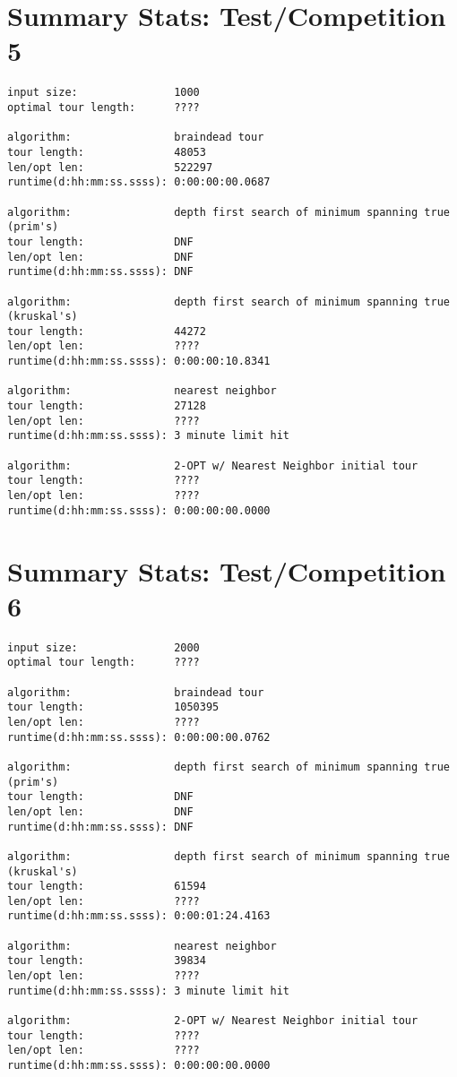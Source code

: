 \documentclass[12pt]{article}
\begin{document}
\newpage
\section*{Summary Stats: Test/Competition 5}
\begin{verbatim}
input size:               1000
optimal tour length:      ????

algorithm:                braindead tour
tour length:              48053
len/opt len:              522297
runtime(d:hh:mm:ss.ssss): 0:00:00:00.0687

algorithm:                depth first search of minimum spanning true (prim's) 
tour length:              DNF
len/opt len:              DNF
runtime(d:hh:mm:ss.ssss): DNF 

algorithm:                depth first search of minimum spanning true (kruskal's) 
tour length:              44272
len/opt len:              ????
runtime(d:hh:mm:ss.ssss): 0:00:00:10.8341

algorithm:                nearest neighbor 
tour length:              27128
len/opt len:              ????
runtime(d:hh:mm:ss.ssss): 3 minute limit hit

algorithm:                2-OPT w/ Nearest Neighbor initial tour
tour length:              ????
len/opt len:              ????
runtime(d:hh:mm:ss.ssss): 0:00:00:00.0000
\end{verbatim}

\newpage
\section*{Summary Stats: Test/Competition 6}
\begin{verbatim}
input size:               2000
optimal tour length:      ????

algorithm:                braindead tour
tour length:              1050395
len/opt len:              ????
runtime(d:hh:mm:ss.ssss): 0:00:00:00.0762

algorithm:                depth first search of minimum spanning true (prim's) 
tour length:              DNF
len/opt len:              DNF
runtime(d:hh:mm:ss.ssss): DNF

algorithm:                depth first search of minimum spanning true (kruskal's) 
tour length:              61594
len/opt len:              ????
runtime(d:hh:mm:ss.ssss): 0:00:01:24.4163

algorithm:                nearest neighbor 
tour length:              39834
len/opt len:              ????
runtime(d:hh:mm:ss.ssss): 3 minute limit hit

algorithm:                2-OPT w/ Nearest Neighbor initial tour
tour length:              ????
len/opt len:              ????
runtime(d:hh:mm:ss.ssss): 0:00:00:00.0000
\end{verbatim}
\end{document}
